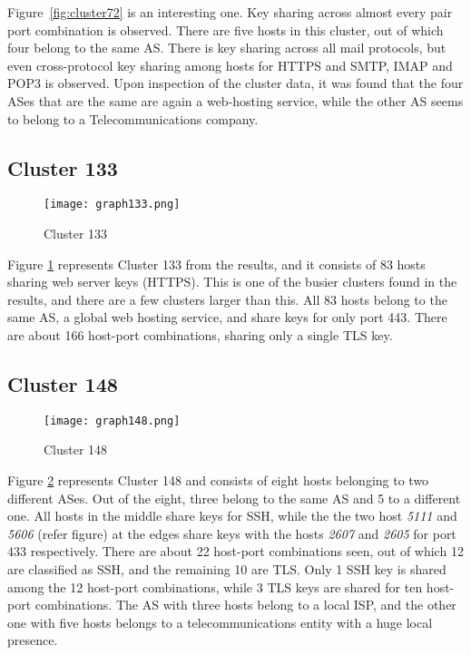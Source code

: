 \noindent Figure~\ref{fig:cluster72} is an interesting one. Key sharing across almost every pair port combination is observed. There are five hosts in this cluster, 
out of which four belong to the same AS. There is key sharing across all mail protocols, but even cross-protocol key sharing among hosts for HTTPS and SMTP, IMAP and POP3 is observed. 
Upon inspection of the cluster data, it was found that the four ASes that are the same are again a web-hosting service, while the other AS seems to belong to a Telecommunications company.  
\pagebreak

\subsection{Cluster 133}
\begin{figure}[h!]
    \centering
    \texttt{[image: graph133.png]}
    \caption{Cluster 133}
    \label{fig:cluster133}
\end{figure}

\noindent Figure \ref*{fig:cluster133} represents Cluster 133 from the results, and it consists of 83 hosts sharing web server keys (HTTPS). This is one of the busier clusters found in the results, and there are a few clusters 
larger than this. All 83 hosts belong to the same AS, a global web hosting service, and share keys for only port 443. There are about 166 host-port combinations, sharing only a single TLS key. 
\pagebreak

\subsection{Cluster 148}
\begin{figure}[h!]
    \centering
    \texttt{[image: graph148.png]}
    \caption{Cluster 148}
    \label{fig:cluster148}
\end{figure}

\noindent Figure \ref{fig:cluster148} represents Cluster 148 and consists of eight hosts belonging to two different ASes. Out of the eight, three belong to the same AS and 5 to a different one.  
All hosts in the middle share keys for SSH, while the the two host \textit{5111} and \textit{5606} (refer figure) at the edges share keys 
with the hosts \textit{2607} and \textit{2605} for port 433 respectively. There are about 22 host-port combinations seen,
out of which 12 are classified as SSH, and the remaining 10 are TLS. Only 1 SSH key is shared among the 12 host-port combinations, while 3 TLS keys are shared for ten host-port combinations. The AS with three hosts belong to a local ISP, and the other one with five hosts 
belongs to a telecommunications entity with a huge local presence. 
\pagebreak


